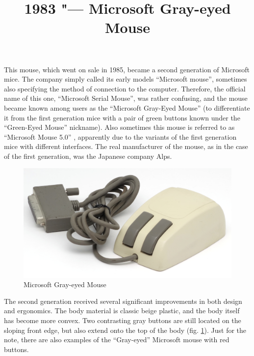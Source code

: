 \documentclass[11pt, a4paper]{article}
\begin{document}
\title{1983 "--- Microsoft Gray-eyed Mouse}
\date{}
\maketitle
{}

This mouse, which went on sale in 1985, became a second generation of Microsoft mice. The company simply called its early models ``Microsoft mouse'', sometimes also specifying the method of connection to the computer. Therefore, the official name of this one, ``Microsoft Serial Mouse'', was rather confusing, and the mouse became known among users as the ``Microsoft Gray-Eyed Mouse'' (to differentiate it from the first generation mice with a pair of green buttons known under the ``Green-Eyed Mouse'' nickname). Also sometimes this mouse is referred to as ``Microsoft Mouse 5.0'' \cite{mouses}, apparently due to the variants of the first generation mice with different interfaces.
The real manufacturer of the mouse, as in the case of the first generation, was the Japanese company Alps.

\begin{figure}[h]
   \centering
    \includegraphics[scale=0.55]{1985_microsoft_gray_eyed_mouse/pic_30.jpg}
    \caption{Microsoft Gray-eyed Mouse}
    \label{fig:MicrosoftGrayEyedPic}
\end{figure}

The second generation received several significant improvements in both design and ergonomics. The body material is classic beige plastic, and the body itself has become more convex. Two contrasting gray buttons are still located on the sloping front edge, but also extend onto the top of the body (fig. \ref{fig:MicrosoftGrayEyedPic}). Just for the note, there are also examples of the ``Gray-eyed'' Microsoft mouse with red buttons.
\end{document}
